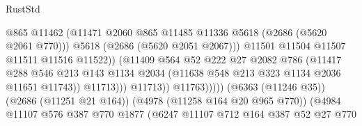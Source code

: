 \begin{lexlean}{RustStd}
\begin{coremodule}
                                                  @865
                                                  @11462
                                                  (@11471
                                                    @2060
                                                    @865
                                                    @11485
                                                    @11336
                                                    @5618
                                                    (@2686 (@5620 @2061 @770)))
                                                  @5618
                                                  (@2686 (@5620 @2051 @2067)))
                                                @11501
                                                @11504
                                                @11507
                                                @11511
                                                @11516
                                                @11522))
                                            (@11409
                                              @564
                                              @52
                                              @222
                                              @27
                                              @2082
                                              @786
                                              (@11417
                                                @288
                                                @546
                                                @213
                                                @143
                                                @1134
                                                @2034
                                                (@11638 @548 @213 @323 @1134 @2036 @11651 @11743))
                                              @11713)))
                                        @11713))
                                    @11763)))))
                          (@6363 (@11246 @35))
                          (@2686 (@11251 @21 @164))
                          (@4978 (@11258 @164 @20 @965 @770))
                          (@4984
                            @11107
                            @576
                            @387
                            @770
                            @1877
                            (@6247
                              @11107
                              @712
                              @164
                              @387
                              @52
                              @27
                              @770

\end{coremodule}
\end{lexlean}

